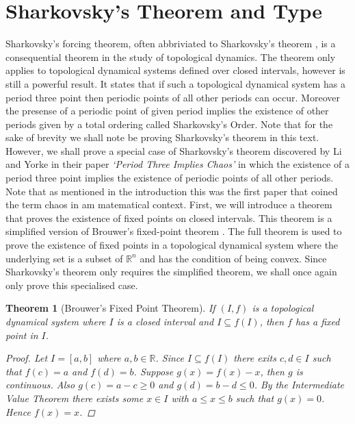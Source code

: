 \documentclass[11pt,a4paper,oneside]{memoir}
\theoremstyle{plain}
\newtheorem{thm}{Theorem}[chapter]
\theoremstyle{definition}
\begin{document}
\section{Sharkovsky's Theorem and Type}\label{sec:sharkovskys-theorem-and-type}
Sharkovsky's forcing theorem, often abbriviated to Sharkovsky's theorem \cite{sharkovsky}, is a consequential theorem in the study of topological dynamics. The theorem only applies to topological dynamical systems defined over closed intervals, however is still a powerful result. It states that if such a topological dynamical system has a period three point then periodic points of all other periods can occur. Moreover the presense of a periodic point of given period implies the existence of other periods given by a total ordering called Sharkovsky's Order. Note that for the sake of brevity we shall note be proving Sharkovsky's theorem in this text. However, we shall prove a special case of Sharkovsky's theorem discovered by Li and Yorke in their paper \emph{`Period Three Implies Chaos'} \cite{li-yorke} in which the existence of a period three point implies the existence of periodic points of all other periods. Note that as mentioned in the introduction this was the first paper that coined the term chaos in am matematical context. First, we will introduce a theorem that proves the existence of fixed points on closed intervals. This theorem is a simplified version of Brouwer's fixed-point theorem \cite{brouwer}. The full theorem is used to prove the existence of fixed points in a topological dynamical system where the underlying set is a subset of $\mathbb{R}^n$ and has the condition of being convex. Since Sharkovsky's theorem only requires the simplified theorem, we shall once again only prove this specialised case.

\begin{thm}[Brouwer's Fixed Point Theorem] \label{thm:interval-fixed-points}
    If $(I, f)$ is a topological dynamical system where $I$ is a closed interval and $I \subseteq f(I)$, then $f$ has a fixed point in $I$.
    \begin{proof}
        Let $I = [a, b]$ where $a, b \in \mathbb{R}$. Since $I \subseteq f(I)$ there exits $c, d \in I$ such that $f(c) = a$ and $f(d) = b$. Suppose $g(x) = f(x) - x$, then $g$ is continuous. Also $g(c) = a - c \geq 0$ and $g(d) = b - d \leq 0$. By the Intermediate Value Theorem there exists some $x \in I$ with $a \leq x \leq b$ such that $g(x) = 0$. Hence $f(x) = x$.
    \end{proof}
\end{thm}
\end{document}
